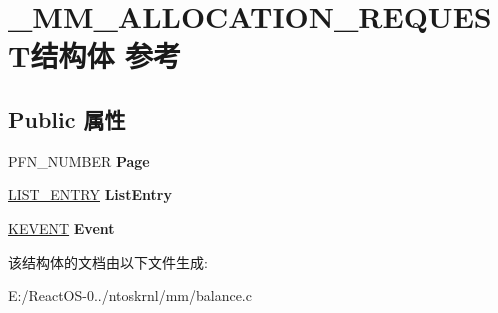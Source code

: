\hypertarget{struct___m_m___a_l_l_o_c_a_t_i_o_n___r_e_q_u_e_s_t}{}\section{\+\_\+\+M\+M\+\_\+\+A\+L\+L\+O\+C\+A\+T\+I\+O\+N\+\_\+\+R\+E\+Q\+U\+E\+S\+T结构体 参考}
\label{struct___m_m___a_l_l_o_c_a_t_i_o_n___r_e_q_u_e_s_t}
\subsection*{Public 属性}
\begin{DoxyCompactItemize}
\item 
\mbox{\label{struct___m_m___a_l_l_o_c_a_t_i_o_n___r_e_q_u_e_s_t_a09704c0b867d380a18dabfd7c8aa26d8}} 
P\+F\+N\+\_\+\+N\+U\+M\+B\+ER {\bfseries Page}
\item 
\mbox{\label{struct___m_m___a_l_l_o_c_a_t_i_o_n___r_e_q_u_e_s_t_ae9c48458a24f8879980f4ac13c9aafce}} 
\hyperlink{struct___l_i_s_t___e_n_t_r_y}{L\+I\+S\+T\+\_\+\+E\+N\+T\+RY} {\bfseries List\+Entry}
\item 
\mbox{\label{struct___m_m___a_l_l_o_c_a_t_i_o_n___r_e_q_u_e_s_t_a062b4a0dcc478bc64128e7e6b15ad99b}} 
\hyperlink{struct___k_e_v_e_n_t}{K\+E\+V\+E\+NT} {\bfseries Event}
\end{DoxyCompactItemize}


该结构体的文档由以下文件生成\+:\begin{DoxyCompactItemize}
\item 
E\+:/\+React\+O\+S-\/0../ntoskrnl/mm/balance.\+c\end{DoxyCompactItemize}
